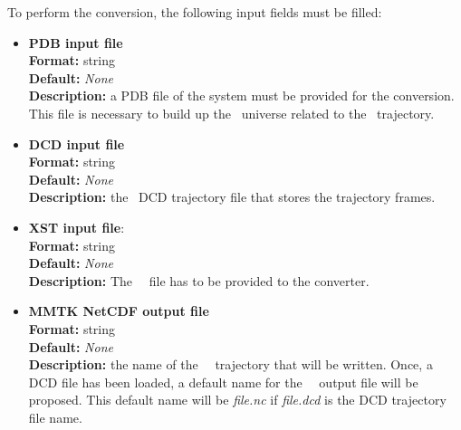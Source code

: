 \documentclass[a4paper,11pt]{report}
\begin{document}
To perform the conversion, the following input fields must be filled:
\hypertarget{namd_converter_pdb_input_file}{}
\begin{itemize}
\item \textbf{PDB input file}\\
\textbf{Format:} string\\
\textbf{Default:} \textit{None}\\
\textbf{Description:} a PDB file of the system must be provided for the conversion. This file is necessary to build up 
the \MMTK\ universe related to the \MMTK\ trajectory. 

\hypertarget{namd_converter_dcd_input_file}{}
\item \textbf{DCD input file}\\
\textbf{Format:} string\\
\textbf{Default:} \textit{None}\\
\textbf{Description:} the \CHARMM\ DCD trajectory file that stores the trajectory frames.

\hypertarget{namd_converter_xst_input_file}{}
\item \textbf{XST input file}:\\
\textbf{Format:} string\\
\textbf{Default:} \textit{None}\\
\textbf{Description:} The \NAMD\ \XST\ file has to be provided to the converter.

\hypertarget{namd_converter_mmtk_netcdf_output_file}{}
\item \textbf{MMTK NetCDF output file}\\
\textbf{Format:} string\\
\textbf{Default:} \textit{None}\\
\textbf{Description:} the name of the \MMTK\ \NetCDF\ trajectory that will be written. Once, a DCD file has been 
loaded, a default name for the \MMTK\ \NetCDF\ output file will be proposed. This default name will be 
\textit{file.nc} if \textit{file.dcd} is the DCD trajectory file name.
\end{itemize}
\end{document}
